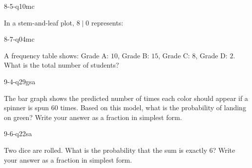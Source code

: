 \begin{practiceQuestion}{8-5-q10}{mc}
\begin{questionText}
In a stem-and-leaf plot, $8 \mid 0$ represents:
\end{questionText}
\end{practiceQuestion}

\begin{practiceQuestion}{8-7-q04}{mc}
\begin{questionText}
A frequency table shows: Grade A: $10$, Grade B: $15$, Grade C: $8$, Grade D: $2$. What is the total number of students?
\end{questionText}
\end{practiceQuestion}

\begin{practiceQuestion}{9-4-q29}{gsa}
\begin{questionText}
The bar graph shows the predicted number of times each color should appear if a spinner is spun $60$ times. Based on this model, what is the probability of landing on green? Write your answer as a fraction in simplest form.

\begin{center}
\end{center}
\end{questionText}
\end{practiceQuestion}

\begin{practiceQuestion}{9-6-q22}{sa}
\begin{questionText}
Two dice are rolled. What is the probability that the sum is exactly $6$? Write your answer as a fraction in simplest form.
\end{questionText}
\end{practiceQuestion}

